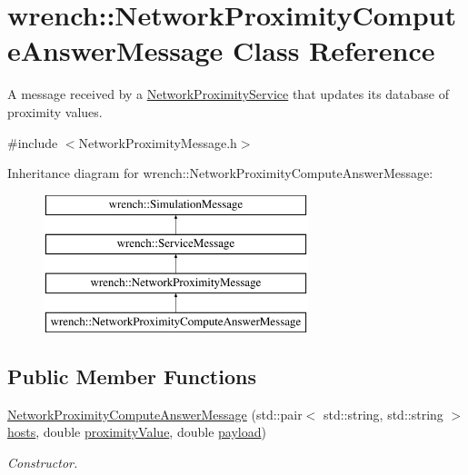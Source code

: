 \hypertarget{classwrench_1_1_network_proximity_compute_answer_message}{}\section{wrench\+:\+:Network\+Proximity\+Compute\+Answer\+Message Class Reference}
\label{classwrench_1_1_network_proximity_compute_answer_message}


A message received by a \hyperlink{classwrench_1_1_network_proximity_service}{Network\+Proximity\+Service} that updates its database of proximity values.  




{\ttfamily \#include $<$Network\+Proximity\+Message.\+h$>$}

Inheritance diagram for wrench\+:\+:Network\+Proximity\+Compute\+Answer\+Message\+:\begin{figure}[H]
\begin{center}
\leavevmode
\includegraphics[height=4.000000cm]{classwrench_1_1_network_proximity_compute_answer_message}
\end{center}
\end{figure}
\subsection*{Public Member Functions}
\begin{DoxyCompactItemize}
\item 
\hyperlink{classwrench_1_1_network_proximity_compute_answer_message_af3313e0c1a8b09232997b787eaaa1dc4}{Network\+Proximity\+Compute\+Answer\+Message} (std\+::pair$<$ std\+::string, std\+::string $>$ \hyperlink{classwrench_1_1_network_proximity_compute_answer_message_addb794ffc7be64710ae8d9753bcd87f2}{hosts}, double \hyperlink{classwrench_1_1_network_proximity_compute_answer_message_ae584ad27ef0f865f78284e5d45c4b863}{proximity\+Value}, double \hyperlink{classwrench_1_1_simulation_message_a914f2732713f7c02898e66f05a7cb8a1}{payload})
\begin{DoxyCompactList}\small\item\em Constructor. \end{DoxyCompactList}\end{DoxyCompactItemize}
